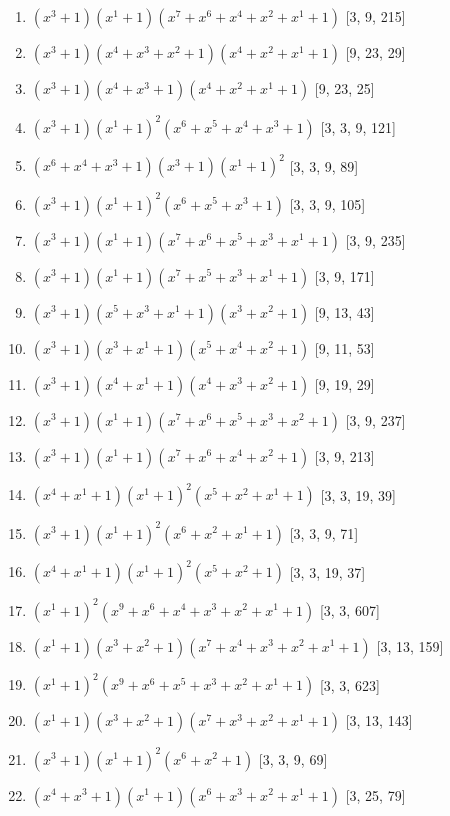 \documentclass[10pt,twocolumn]{article}
\begin{document}
\begin{enumerate}
\item $(x^{3} + 1)(x^{1} + 1)(x^{7} + x^{6} + x^{4} + x^{2} + x^{1} + 1)$  [3, 9, 215]
\item $(x^{3} + 1)(x^{4} + x^{3} + x^{2} + 1)(x^{4} + x^{2} + x^{1} + 1)$  [9, 23, 29]
\item $(x^{3} + 1)(x^{4} + x^{3} + 1)(x^{4} + x^{2} + x^{1} + 1)$  [9, 23, 25]
\item $(x^{3} + 1)(x^{1} + 1)^{2}(x^{6} + x^{5} + x^{4} + x^{3} + 1)$  [3, 3, 9, 121]
\item $(x^{6} + x^{4} + x^{3} + 1)(x^{3} + 1)(x^{1} + 1)^{2}$  [3, 3, 9, 89]
\item $(x^{3} + 1)(x^{1} + 1)^{2}(x^{6} + x^{5} + x^{3} + 1)$  [3, 3, 9, 105]
\item $(x^{3} + 1)(x^{1} + 1)(x^{7} + x^{6} + x^{5} + x^{3} + x^{1} + 1)$  [3, 9, 235]
\item $(x^{3} + 1)(x^{1} + 1)(x^{7} + x^{5} + x^{3} + x^{1} + 1)$  [3, 9, 171]
\item $(x^{3} + 1)(x^{5} + x^{3} + x^{1} + 1)(x^{3} + x^{2} + 1)$  [9, 13, 43]
\item $(x^{3} + 1)(x^{3} + x^{1} + 1)(x^{5} + x^{4} + x^{2} + 1)$  [9, 11, 53]
\item $(x^{3} + 1)(x^{4} + x^{1} + 1)(x^{4} + x^{3} + x^{2} + 1)$  [9, 19, 29]
\item $(x^{3} + 1)(x^{1} + 1)(x^{7} + x^{6} + x^{5} + x^{3} + x^{2} + 1)$  [3, 9, 237]
\item $(x^{3} + 1)(x^{1} + 1)(x^{7} + x^{6} + x^{4} + x^{2} + 1)$  [3, 9, 213]
\item $(x^{4} + x^{1} + 1)(x^{1} + 1)^{2}(x^{5} + x^{2} + x^{1} + 1)$  [3, 3, 19, 39]
\item $(x^{3} + 1)(x^{1} + 1)^{2}(x^{6} + x^{2} + x^{1} + 1)$  [3, 3, 9, 71]
\item $(x^{4} + x^{1} + 1)(x^{1} + 1)^{2}(x^{5} + x^{2} + 1)$  [3, 3, 19, 37]
\item $(x^{1} + 1)^{2}(x^{9} + x^{6} + x^{4} + x^{3} + x^{2} + x^{1} + 1)$  [3, 3, 607]
\item $(x^{1} + 1)(x^{3} + x^{2} + 1)(x^{7} + x^{4} + x^{3} + x^{2} + x^{1} + 1)$  [3, 13, 159]
\item $(x^{1} + 1)^{2}(x^{9} + x^{6} + x^{5} + x^{3} + x^{2} + x^{1} + 1)$  [3, 3, 623]
\item $(x^{1} + 1)(x^{3} + x^{2} + 1)(x^{7} + x^{3} + x^{2} + x^{1} + 1)$  [3, 13, 143]
\item $(x^{3} + 1)(x^{1} + 1)^{2}(x^{6} + x^{2} + 1)$  [3, 3, 9, 69]
\item $(x^{4} + x^{3} + 1)(x^{1} + 1)(x^{6} + x^{3} + x^{2} + x^{1} + 1)$  [3, 25, 79]

\end{enumerate}
\end{document}
